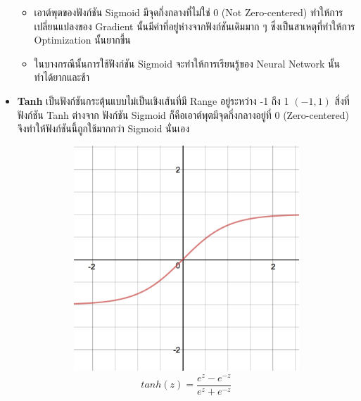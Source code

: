 \begin{itemize}
\begin{itemize}
        \item เอาต์พุตของฟังก์ชัน Sigmoid มีจุดกึ่งกลางที่ไม่ใช่ 0 (Not Zero-centered) ทำให้การเปลี่ยนแปลงของ Gradient 
        นั้นมีค่าที่อยู่ห่างจากฟังก์ชันเดิมมาก ๆ ซึ่งเป็นสาเหตุที่ทำให้การ Optimization นั้นยากขึ้น

        \item ในบางกรณีนั้นการใช้ฟังก์ชัน Sigmoid จะทำให้การเรียนรู้ของ Neural Network นั้นทำได้ยากและช้า
    \end{itemize}

    \item \textbf{Tanh} เป็นฟังก์ชันกระตุ้นแบบไม่เป็นเชิงเส้นที่มี Range อยู่ระหว่าง -1 ถึง 1 $(-1, 1)$ สิ่งที่ฟังก์ชัน Tanh ต่างจาก%
    ฟังก์ชัน Sigmoid ก็คือเอาต์พุตมีจุดกึ่งกลางอยู่ที่ 0 (Zero-centered) จึงทำให้ฟังก์ชันนี้ถูกใช้มากกว่า Sigmoid นั่นเอง
    \begin{figure}[htbp]
        \centering
        \begin{subfigure}{0.5\textwidth}
            \centering
            \includegraphics[width=0.9\linewidth]{fig/actfunc_tanh.png}
            \caption{%
                \begin{equation}
                    tanh(z) = \frac{e^{z} - e^{-z}}{e^{z} + e^{-z}}
                \end{equation}
            }
            \label{fig:actfunc_tanh}
        \end{subfigure}%
        \begin{subfigure}{0.5\textwidth}

\end{subfigure}
\end{figure}
\end{itemize}
